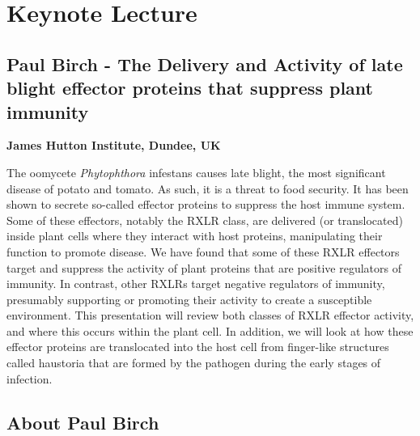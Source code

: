\documentclass[12pt,]{book}
\theoremstyle{definition}
\theoremstyle{definition}
\theoremstyle{remark}
\begin{document}
\section*{Keynote Lecture}\label{keynote-lecture-4}

\subsection*{Paul Birch - The Delivery and Activity of late blight
effector proteins that suppress plant
immunity}\label{paul-birch---the-delivery-and-activity-of-late-blight-effector-proteins-that-suppress-plant-immunity}

\textbf{James Hutton Institute, Dundee, UK}

The oomycete \emph{Phytophthora} infestans causes late blight, the most
significant disease of potato and tomato. As such, it is a threat to
food security. It has been shown to secrete so-called effector proteins
to suppress the host immune system. Some of these effectors, notably the
RXLR class, are delivered (or translocated) inside plant cells where
they interact with host proteins, manipulating their function to promote
disease. We have found that some of these RXLR effectors target and
suppress the activity of plant proteins that are positive regulators of
immunity. In contrast, other RXLRs target negative regulators of
immunity, presumably supporting or promoting their activity to create a
susceptible environment. This presentation will review both classes of
RXLR effector activity, and where this occurs within the plant cell. In
addition, we will look at how these effector proteins are translocated
into the host cell from finger-like structures called haustoria that are
formed by the pathogen during the early stages of infection.

\subsection*{About Paul Birch}\label{about-paul-birch}
\end{document}
